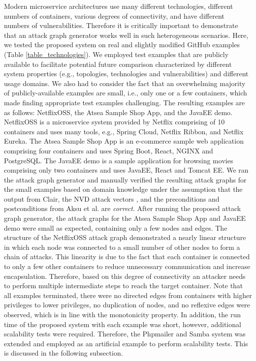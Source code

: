 Modern microservice architectures use many different technologies,  different numbers of containers, various degrees of connectivity, and have different numbers of vulnerabilities. Therefore it is critically important to demonstrate that an attack graph generator works well in such heterogeneous scenarios. Here, we tested the proposed system on real and slightly modified GitHub examples (Table \ref{table_technologies}). We employed test examples that are publicly available to facilitate potential future comparison characterized by different system properties (e.g., topologies, technologies and vulnerabilities) and different usage domains. We also had to consider the fact that an overwhelming majority of publicly-available examples are small, i.e., only one or a few containers, which made finding appropriate test examples challenging. The resulting examples are as follows: NetflixOSS, the Atsea Sample Shop App, and the JavaEE demo. NetflixOSS is a microservice system provided by Netflix comprising of 10 containers and uses many tools, e.g., Spring Cloud, Netflix Ribbon, and Netflix Eureka. The Atsea Sample Shop App is an e-commerce sample web application comprising four containers and uses Spring Boot, React, NGINX and PostgreSQL. The JavaEE demo is a sample application for browsing movies comprising only two containers and uses JavaEE, React and Tomcat EE. We ran the attack graph generator and manually verified the resulting attack graphs for the small examples based on domain knowledge under the assumption that the output from Clair, the NVD attack vectors \cite{booth2013national}, and the preconditions and postconditions from Aksu et al. \cite{aksu2018automated} are \textit{correct}. After running the proposed attack graph generator, the attack graphs for the Atsea Sample Shop App and JavaEE demo were small as expected, containing only a few nodes and edges. The structure of the NetflixOSS attack graph demonstrated a nearly linear structure in which each node was connected to a small number of other nodes to form a chain of attacks. This linearity is due to the fact that each container is connected to only a few other containers to reduce unnecessary communication and increase encapsulation. Therefore, based on this degree of connectivity an attacker needs to perform multiple intermediate steps to reach the target container. Note that all examples terminated, there were no directed edges from containers with higher privileges to lower privileges, no duplication of nodes, and no reflexive edges were observed, which is in line with the monotonicity property. In addition, the run time of the proposed system with each example was short, however, additional scalability tests were required. Therefore, the Phpmailer and Samba system was extended and employed as an artificial example to perform scalability tests. This is discussed in the following subsection.



